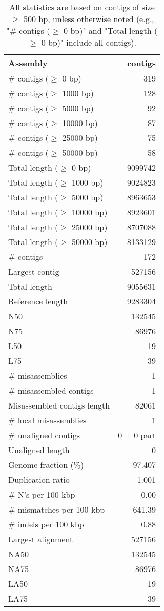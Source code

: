 \documentclass[12pt,a4paper]{article}
\begin{document}
\begin{table}[ht]
\begin{center}
\caption{All statistics are based on contigs of size $\geq$ 500 bp, unless otherwise noted (e.g., "\# contigs ($\geq$ 0 bp)" and "Total length ($\geq$ 0 bp)" include all contigs).}
\begin{tabular}{|l*{1}{|r}|}
\hline
Assembly & contigs \\ \hline
\# contigs ($\geq$ 0 bp) & 319 \\ \hline
\# contigs ($\geq$ 1000 bp) & 128 \\ \hline
\# contigs ($\geq$ 5000 bp) & 92 \\ \hline
\# contigs ($\geq$ 10000 bp) & 87 \\ \hline
\# contigs ($\geq$ 25000 bp) & 75 \\ \hline
\# contigs ($\geq$ 50000 bp) & 58 \\ \hline
Total length ($\geq$ 0 bp) & 9099742 \\ \hline
Total length ($\geq$ 1000 bp) & 9024823 \\ \hline
Total length ($\geq$ 5000 bp) & 8963653 \\ \hline
Total length ($\geq$ 10000 bp) & 8923601 \\ \hline
Total length ($\geq$ 25000 bp) & 8707088 \\ \hline
Total length ($\geq$ 50000 bp) & 8133129 \\ \hline
\# contigs & 172 \\ \hline
Largest contig & 527156 \\ \hline
Total length & 9055631 \\ \hline
Reference length & 9283304 \\ \hline
N50 & 132545 \\ \hline
N75 & 86976 \\ \hline
L50 & 19 \\ \hline
L75 & 39 \\ \hline
\# misassemblies & 1 \\ \hline
\# misassembled contigs & 1 \\ \hline
Misassembled contigs length & 82061 \\ \hline
\# local misassemblies & 1 \\ \hline
\# unaligned contigs & 0 + 0 part \\ \hline
Unaligned length & 0 \\ \hline
Genome fraction (\%) & 97.407 \\ \hline
Duplication ratio & 1.001 \\ \hline
\# N's per 100 kbp & 0.00 \\ \hline
\# mismatches per 100 kbp & 641.39 \\ \hline
\# indels per 100 kbp & 0.88 \\ \hline
Largest alignment & 527156 \\ \hline
NA50 & 132545 \\ \hline
NA75 & 86976 \\ \hline
LA50 & 19 \\ \hline
LA75 & 39 \\ \hline
\end{tabular}
\end{center}
\end{table}
\end{document}
